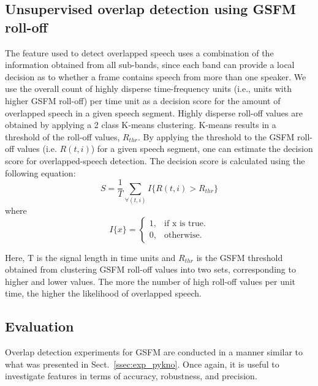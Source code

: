 {\subsection{Unsupervised overlap detection using GSFM roll-off}
\label{sssec:unsupervised_ovl_det_gsfm}
The feature used to detect overlapped speech uses a combination of the information obtained from all sub-bands, since each band can provide a local decision as to whether a frame contains speech from more than one speaker. 
We use the overall count of highly disperse time-frequency units (i.e., units with higher GSFM roll-off) per time unit as a decision score for the amount of overlapped speech in a given speech segment. 
Highly disperse roll-off values are obtained by applying a 2 class K-means clustering. 
K-means results in a threshold of the roll-off values, $R_{thr}$. 
By applying the threshold to the GSFM roll-off values (i.e. $R(t, i)$) for a given speech segment, one can estimate the decision score for overlapped-speech detection. 
The decision score is calculated using the following equation:
\begin{equation}
\label{eq:gsfm_features}
S = \frac{1}{T}\sum\limits_{\forall (t,i)} I\{R(t,i) > R_{thr}\}
\end{equation}
where
\begin{equation}
I\{x\}=\begin{cases}
1, & \text{if x is true}.\\
0, & \text{otherwise}.
\end{cases}
\end{equation}

Here, T is the signal length in time units and $R_{thr}$ is the GSFM threshold obtained from clustering GSFM roll-off values into two sets, corresponding to higher and lower values. 
The more the number of high roll-off values per unit time, the higher the likelihood of overlapped speech. 

\subsection{Evaluation}
\label{ssec:exp_gsfm}
Overlap detection experiments for GSFM are conducted in a manner similar to what was presented in Sect.~\ref{ssec:exp_pykno}. 
Once again, it is useful to investigate features in terms of accuracy, robustness, and precision. 

\vspace{3mm}
}
